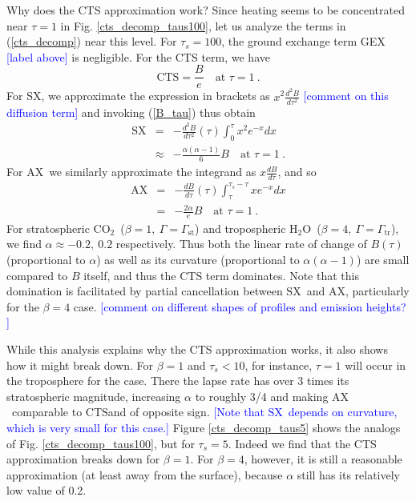\documentclass[10pt]{article}
\newcommand{\comment}[1]{\textcolor{blue}{[{#1}]}}
\newcommand{\beqn}{\begin{equation}}
\newcommand{\eeqn}{\end{equation}}
\newcommand{\beqa}{\begin{eqnarray}}
\newcommand{\eeqa}{\end{eqnarray}}
\newcommand{\eqnref}[1]{(\ref{#1})}
\newcommand{\n}{\nonumber}
\newcommand{\cotwo}{\ensuremath{\mathrm{CO_2}}}
\newcommand{\htwo}{\ensuremath{\mathrm{H_2O}}}
\newcommand{\taus}{\ensuremath{\tau_s}}
\newcommand{\SX}{\ensuremath{\mathrm{SX}}}
\newcommand{\AX}{\ensuremath{\mathrm{AX}}}
\newcommand{\CTS}{\ensuremath{\mathrm{CTS}}}
\newcommand{\gammatr}{\ensuremath{\Gamma_\mathrm{tr}}}
\newcommand{\gammast}{\ensuremath{\Gamma_\mathrm{st}}}
\begin{document}
Why does the CTS approximation work? Since heating seems to be concentrated near $\tau=1$ in Fig. \ref{cts_decomp_taus100}, let us analyze the terms in \eqnref{cts_decomp} near this level. For $\taus =100$, the ground exchange term GEX \comment{label above} is negligible. For the CTS term, we have
\beqn
\CTS = \frac{B}{e} \quad \mbox{at $\tau=1$} \ .
\eeqn
For SX, we approximate the expression in brackets as $x^2\frac{d^2 B}{d \tau^2}$ \comment{comment on this diffusion term} and invoking \eqnref{B_tau} thus obtain
\beqa
	\SX & =  & -  \frac{d^2 B}{d \tau^2}(\tau) \int_0^\tau x^2 e^{-x} dx \n \\
			& \approx & - \frac{\alpha(\alpha-1)}{6}B \quad \mbox{at $\tau=1$} \ .
\eeqa  
For \AX\ we similarly approximate the integrand as $x\frac{d B}{d \tau}$, and so
\beqa
	\AX & =  & - \frac{d B}{d \tau}(\tau) \int_\tau^{\taus - \tau} x e^{-x} dx \n \\
			& = & - \frac{2\alpha}{e}B \quad \mbox{at $\tau=1$} \ .
\eeqa  
For stratospheric \cotwo\ ($\beta = 1,\  \Gamma = \gammast$) and tropospheric \htwo\ ($\beta = 4,\  \Gamma = \gammatr$), we find $\alpha \approx -0.2,\ 0.2$ respectively.  Thus both the linear rate of change of $B(\tau)$ (proportional to $\alpha$) as well as its curvature (proportional to $\alpha(\alpha-1)$) are small compared to $B$ itself, and thus the CTS term dominates. Note that this domination is facilitated by partial cancellation between \SX\ and \AX, particularly for the $\beta=4$ case. \comment{comment on different shapes of profiles and emission heights? }

While this analysis explains why the CTS approximation works, it also shows how it might break down. For $\beta=1$ and $\taus < 10$, for instance, $\tau=1$ will occur in the troposphere for the  case. There the lapse rate has over 3 times its stratospheric magnitude, increasing $\alpha$ to roughly 3/4 and making \AX\ comparable to \CTS and of opposite sign. \comment{Note that \SX\ depends on curvature, which is very small for this case.} Figure \ref{cts_decomp_taus5} shows the analogs of Fig. \ref{cts_decomp_taus100}, but for $\taus=5$. Indeed we find that the CTS approximation breaks down for $\beta =1$. For $\beta=4$, however, it is still a reasonable approximation (at least away from the surface), because $\alpha$ still has its relatively low value of 0.2.  
\end{document}
